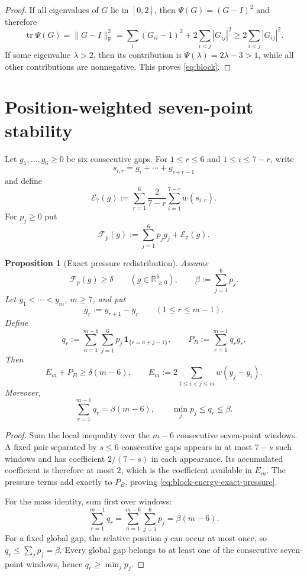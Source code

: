 \documentclass[11pt]{article}
\newtheorem{proposition}[theorem]{Proposition}
\DeclareMathOperator{\tr}{tr}
\newcommand{\Frob}{\mathrm F}
\newcommand{\R}{\mathbb R}
\newcommand{\cE}{\mathcal E}
\begin{document}
\begin{proof}
If all eigenvalues of $G$ lie in $[0,2]$, then
$\Psi(G)=(G-I)^2$ and therefore
\[
 \tr\Psi(G)=\|G-I\|_{\Frob}^2
 =\sum_i(G_{ii}-1)^2+2\sum_{i<j}|G_{ij}|^2
 \ge 2\sum_{i<j}|G_{ij}|^2.
\]
If some eigenvalue $\lambda>2$, then its contribution is
$\Psi(\lambda)=2\lambda-3>1$, while all other contributions are nonnegative.
This proves \eqref{eq:block}.
\end{proof}

\section{Position-weighted seven-point stability}\label{sec:local}

Let $g_1,\ldots,g_6\ge0$ be six consecutive gaps.  For
$1\le r\le6$ and $1\le i\le7-r$, write
\[
 s_{i,r}=g_i+\cdots+g_{i+r-1}
\]
and define
\begin{equation}\label{eq:E7}
 \cE_7(g):=
 \sum_{r=1}^6\frac{2}{7-r}
 \sum_{i=1}^{7-r}w(s_{i,r}).
\end{equation}
For $p_j\ge0$ put
\begin{equation}\label{eq:Fp}
 \mathcal F_p(g):=\sum_{j=1}^6p_jg_j+\cE_7(g).
\end{equation}

\begin{proposition}[Exact pressure redistribution]\label{prop:redist}
Assume
\[
 \mathcal F_p(g)\ge\delta
 \qquad(g\in\R_{\ge0}^6),
 \qquad
 \beta:=\sum_{j=1}^6p_j.
\]
Let \(y_1<\cdots<y_m\), \(m\ge7\), and put
\[
 g_r:=y_{r+1}-y_r
 \qquad(1\le r\le m-1).
\]
Define
\begin{equation}\label{eq:qr}
 q_r
 :=
 \sum_{a=1}^{m-6}\sum_{j=1}^6
 p_j\,\mathbf 1_{\{r=a+j-1\}},
 \qquad
 P_B:=\sum_{r=1}^{m-1}q_rg_r .
\end{equation}
Then
\begin{equation}\label{eq:block-energy-exact-pressure}
 E_m+P_B\ge\delta(m-6),
 \qquad
 E_m:=2\sum_{1\le i<j\le m}w(y_j-y_i).
\end{equation}
Moreover,
\begin{equation}\label{eq:pressure-mass}
 \boxed{\sum_{r=1}^{m-1}q_r=\beta(m-6)},
 \qquad
 \min_jp_j\le q_r\le\beta .
\end{equation}
\end{proposition}

\begin{proof}
Sum the local inequality over the \(m-6\) consecutive seven-point windows.
A fixed pair separated by \(s\le6\) consecutive gaps appears in at most
\(7-s\) such windows and has coefficient \(2/(7-s)\) in each appearance.
Its accumulated coefficient is therefore at most \(2\), which is the
coefficient available in \(E_m\).  The pressure terms add exactly to
\(P_B\), proving \eqref{eq:block-energy-exact-pressure}.

For the mass identity, sum first over windows:
\[
 \sum_{r=1}^{m-1}q_r
 =
 \sum_{a=1}^{m-6}\sum_{j=1}^6p_j
 =
 \beta(m-6).
\]
For a fixed global gap, the relative position \(j\) can occur at most once,
so \(q_r\le\sum_jp_j=\beta\).  Every global gap belongs to at least one of
the consecutive seven-point windows, hence \(q_r\ge\min_jp_j\).
\end{proof}
\end{document}

